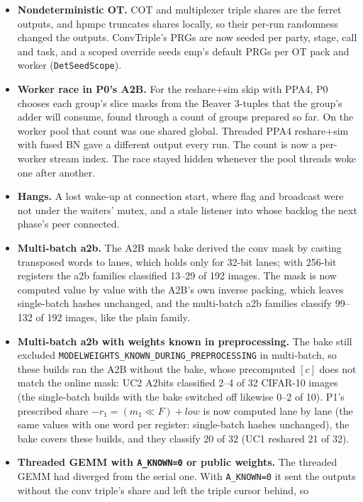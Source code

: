 \documentclass[10pt,a4paper]{article}
\newcommand{\flag}[1]{\nolinkurl{#1}}
\begin{document}
\begin{itemize}\itemsep1pt
\item \textbf{Nondeterministic OT.} COT and multiplexer triple shares are the ferret outputs, and hpmpc
  truncates shares locally, so their per-run randomness changed the outputs. ConvTriple's PRGs are now seeded per party, stage, call and
  task, and a scoped override seeds emp's default PRGs per OT pack and worker (\texttt{DetSeedScope}).
\item \textbf{Worker race in P0's A2B.} For the reshare+sim skip with PPA4, P0 chooses each group's slice
  masks from the Beaver 3-tuples that the group's adder will consume, found through a count of groups prepared so far. On
  the worker pool that count was one shared global. Threaded PPA4 reshare+sim with fused BN gave a different
  output every run. The count is now a per-worker stream index. The race stayed hidden whenever the pool threads woke one after another.
\item \textbf{Hangs.} A lost wake-up at connection start, where flag and broadcast were not under the waiters' mutex, and a stale listener
  into whose backlog the next phase's peer connected.
\item \textbf{Multi-batch a2b.} The A2B mask bake derived the conv mask by casting transposed words to lanes,
  which holds only for 32-bit lanes; with 256-bit registers the a2b families classified 13--29 of 192
  images. The mask is now computed value by value with the A2B's own inverse packing, which leaves single-batch
  hashes unchanged, and the multi-batch a2b families classify 99--132 of 192 images, like the plain family.
\item \textbf{Multi-batch a2b with weights known in preprocessing.} The bake still excluded
  \flag{MODELWEIGHTS_KNOWN_DURING_PREPROCESSING} in multi-batch, so these builds ran the A2B without the bake, whose
  precomputed $[c]$ does not match the online mask: UC2 A2bits classified 2--4 of 32 CIFAR-10 images (the single-batch
  builds with the bake switched off likewise 0--2 of 10). P1's prescribed share $-r_1 = (m_1 \ll F) + \mathit{low}$ is
  now computed lane by lane (the same values with one word per register: single-batch hashes unchanged), the bake
  covers these builds, and they classify 20 of 32 (UC1 reshared 21 of 32).
\item \textbf{Threaded GEMM with \flag{A_KNOWN=0} or public weights.} The threaded GEMM had diverged from the serial one.
  With \flag{A_KNOWN=0} it sent the outputs without the conv triple's share and left the triple cursor behind, so

\end{itemize}
\end{document}
